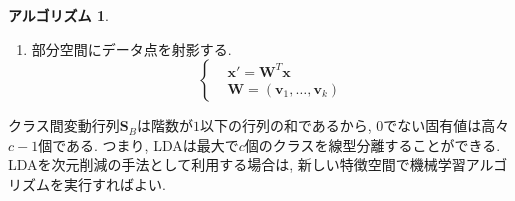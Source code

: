 \documentclass[uplatex]{jsarticle}
\theoremstyle{definition}
\newtheorem{algorithm}[definition]{アルゴリズム}
\numberwithin{equation}{section}
\begin{document}
\begin{algorithm}
\begin{enumerate}
        \item
        部分空間にデータ点を射影する.
        \begin{equation}
            \left\{
            \begin{aligned}
                &\bm{x}' = \bm{W}^{T}\bm{x} \\
                &\bm{W} = (\bm{v}_{1}, \dots, \bm{v}_{k})
            \end{aligned}
            \right.
        \end{equation}
    \end{enumerate}
\end{algorithm}

クラス間変動行列$\bm{S}_{B}$は階数が$1$以下の行列の和であるから, $0$でない固有値は高々$c - 1$個である.
つまり, LDAは最大で$c$個のクラスを線型分離することができる.
LDAを次元削減の手法として利用する場合は, 新しい特徴空間で機械学習アルゴリズムを実行すればよい.
\end{document}

